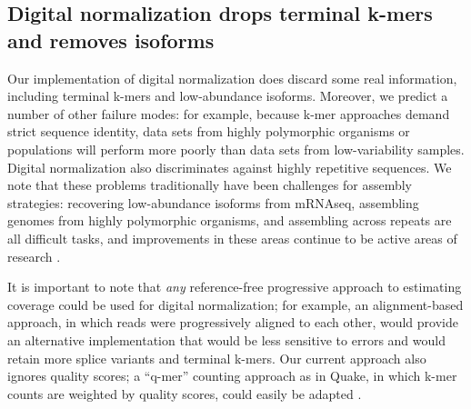 \documentclass{pnastwo}
\begin{document}
\begin{article}



\subsection{Digital normalization drops terminal k-mers and removes isoforms}

Our implementation of digital normalization does discard some real
information, including terminal k-mers and low-abundance isoforms.
Moreover, we predict a number of other failure modes: for example,
because k-mer approaches demand strict sequence identity, data sets
from highly polymorphic organisms or populations will perform more
poorly than data sets from low-variability samples.  Digital
normalization also discriminates against highly repetitive
sequences. We note that these problems traditionally have been
challenges for assembly strategies: recovering low-abundance isoforms
from mRNAseq, assembling genomes from highly polymorphic organisms,
and assembling across repeats are all difficult tasks, and improvements
in these areas continue to
be active areas of research
\cite{pubmed18549302,pubmed20633259,pubmed18541131}.

It is important to note that {\em any} reference-free progressive
approach to estimating coverage could be used for digital
normalization; for example, an alignment-based approach, in which
reads were progressively aligned to each other, would provide an
alternative implementation that would be less sensitive to errors and
would retain more splice variants and terminal k-mers.  Our current
approach also ignores quality scores; a ``q-mer'' counting approach as
in Quake, in which k-mer counts are weighted by quality scores, could
easily be adapted \cite{pubmed21114842}.


\end{article}
\end{document}
